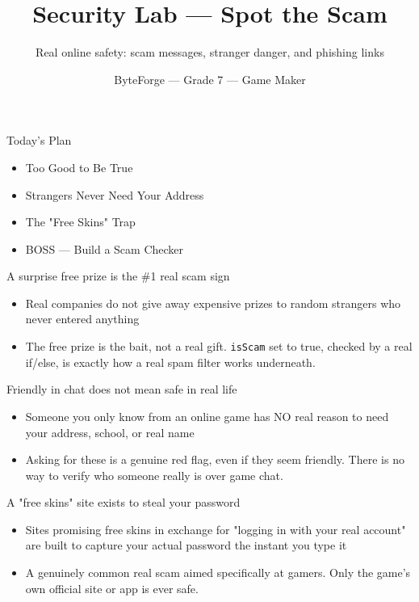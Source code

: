 \documentclass[aspectratio=169]{beamer}
\title{Security Lab — Spot the Scam}
\subtitle{Real online safety: scam messages, stranger danger, and phishing links}
\author{ByteForge --- Grade 7 --- Game Maker}
\date{}
\begin{document}
\begin{frame}
    \titlepage
\end{frame}

\begin{frame}{Today's Plan}
    \begin{itemize}
        \item Too Good to Be True
        \item Strangers Never Need Your Address
        \item The "Free Skins" Trap
        \item[$\bigstar$] BOSS --- Build a Scam Checker
    \end{itemize}
\end{frame}

\begin{frame}{A surprise free prize is the \#1 real scam sign}
    \large
    \begin{itemize}
        \item Real companies do not give away expensive prizes to random strangers who never entered anything
        \item The free prize is the bait, not a real gift. \texttt{isScam} set to true, checked by a real if/else, is exactly how a real spam filter works underneath.
    \end{itemize}
\end{frame}


\begin{frame}{Friendly in chat does not mean safe in real life}
    \large
    \begin{itemize}
        \item Someone you only know from an online game has NO real reason to need your address, school, or real name
        \item Asking for these is a genuine red flag, even if they seem friendly. There is no way to verify who someone really is over game chat.
    \end{itemize}
\end{frame}


\begin{frame}{A "free skins" site exists to steal your password}
    \large
    \begin{itemize}
        \item Sites promising free skins in exchange for "logging in with your real account" are built to capture your actual password the instant you type it
        \item A genuinely common real scam aimed specifically at gamers. Only the game's own official site or app is ever safe.
    \end{itemize}
\end{frame}
\end{document}
